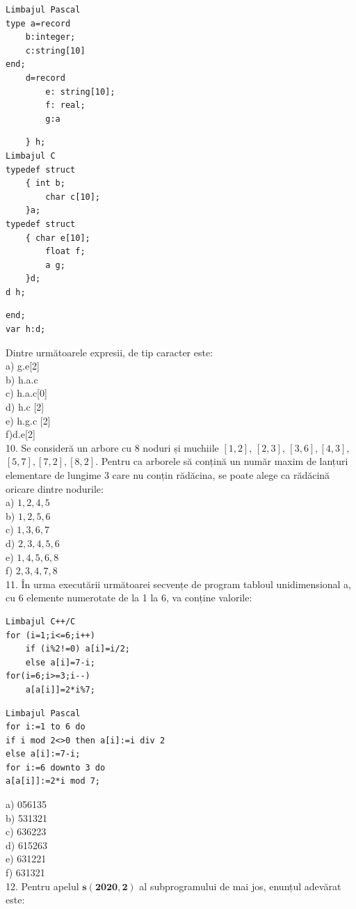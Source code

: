\documentclass[10pt]{article}
\begin{document}
\begin{verbatim}
Limbajul Pascal
type a=record
    b:integer;
    c:string[10]
end;
    d=record
        e: string[10];
        f: real;
        g:a
\end{verbatim}

\begin{verbatim}
    } h;
Limbajul C
typedef struct
    { int b;
        char c[10];
    }a;
typedef struct
    { char e[10];
        float f;
        a g;
    }d;
d h;
\end{verbatim}

\begin{verbatim}
end;
var h:d;
\end{verbatim}

Dintre următoarele expresii, de tip caracter este:\\[0pt]
a) g.e[2]\\
b) h.a.c\\[0pt]
c) h.a.c[0]\\[0pt]
d) h.c [2]\\[0pt]
e) h.g.c [2]\\[0pt]
f)d.e[2]\\
10. Se consideră un arbore cu 8 noduri și muchiile $[1,2]$, $[2,3]$, $[3,6],[4,3]$, $[5,7],[7,2],[8,2]$. Pentru ca arborele să conțină un număr maxim de lanțuri elementare de lungime 3 care nu conțin rădăcina, se poate alege ca rădăcină oricare dintre nodurile:\\
a) $1,2,4,5$\\
b) $1,2,5,6$\\
c) $1,3,6,7$\\
d) $2,3,4,5,6$\\
e) $1,4,5,6,8$\\
f) $2,3,4,7,8$\\
11. În urma executării următoarei secvențe de program tabloul unidimensional a, cu 6 elemente numerotate de la 1 la 6, va conține valorile:

\begin{verbatim}
Limbajul C++/C
for (i=1;i<=6;i++)
    if (i%2!=0) a[i]=i/2;
    else a[i]=7-i;
for(i=6;i>=3;i--)
    a[a[i]]=2*i%7;
\end{verbatim}

\begin{verbatim}
Limbajul Pascal
for i:=1 to 6 do
if i mod 2<>0 then a[i]:=i div 2
else a[i]:=7-i;
for i:=6 downto 3 do
a[a[i]]:=2*i mod 7;
\end{verbatim}

a) 056135\\
b) 531321\\
c) 636223\\
d) 615263\\
e) 631221\\
f) 631321\\
12. Pentru apelul $\mathbf{s}(\mathbf{2 0 2 0}, \mathbf{2})$ al subprogramului de mai jos, enunțul adevărat este:
\end{document}
